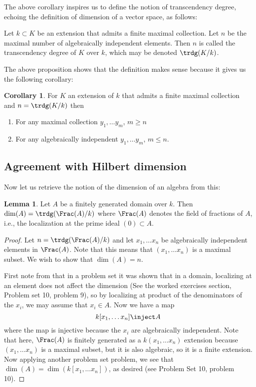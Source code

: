 \documentclass[12 pt]{article}
\theoremstyle{definition}
\newtheorem{corollary}[theorem]{Corollary}
\newtheorem{lemma}[theorem]{Lemma}
\begin{document}
The above corollary inspires us to define the notion of transcendency degree, echoing the definition of dimension of a vector space, as follows:

\begin{definition} Let $k \subset K$ be an extension that admits a finite maximal collection. Let $n$ be the maximal number of algebraically independent elements. Then $n$ is called the transcendency degree of $K$ over $k$, which may be denoted $\trdg(K/k)$.
\end{definition}

The above proposition shows that the definition makes sense because it gives us the following corollary:

\begin{corollary} For $K$ an extension of $k$ that admits a finite maximal collection and $n=\trdg(K/k)$ then
\begin{enumerate}
\item For any maximal collection $y_1, \ldots y_m$, $m \geq n$

\item For any algebraically independent $y_1, \ldots y_m$, $m \leq n$.
\end{enumerate}
\end{corollary}

\subsection{Agreement with Hilbert dimension}

Now let us retrieve the notion of the dimension of an algebra from this:

\begin{lemma} Let $A$ be a finitely generated domain over $k$. Then $\dim(A)=\trdg(\Frac(A)/k)$ where $\Frac(A)$ denotes the field of fractions of $A$, i.e., the localization at the prime ideal $(0) \subset A$.
\end{lemma}
\begin{proof} Let $n =\trdg(\Frac(A)/k)$ and let $x_1, \ldots x_n$ be algebraically independent elements in $\Frac(A)$. Note that this means that $(x_1, \ldots x_n)$ is a maximal subset. We wish to show that $\dim(A)=n$.

First note from that in a problem set it was shown that in a domain, localizing at an element does not affect the dimension (See the worked exercises section, Problem set 10, problem 9), so by localizing at product of the denominators of the $x_i$, we may assume that $x_i \in A$. Now we have a map
\[k[x_1, \ldots x_n] \inject A\]
where the map is injective because the $x_i$ are algebraically independent. Note that here, $\Frac(A)$ is finitely generated as a $k(x_1, \ldots x_n)$ extension because $(x_1, \ldots x_n)$ is a maximal subset, but it is also algebraic, so it is a finite extension. Now applying another problem set problem, we see that $\dim(A)=\dim(k[x_1, \ldots x_n])$, as desired (see Problem Set 10, problem 10).
\end{proof}
\end{document}
